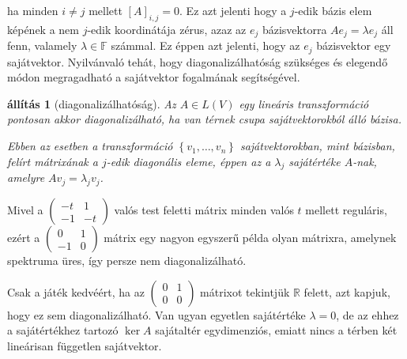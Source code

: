 \documentclass[a4paper, showtrims]{memoir}
\theoremstyle{plain}
\newtheorem{proposition}{állítás}[chapter]
\theoremstyle{remark}
\theoremstyle{definition}
\begin{document}
ha minden $i\neq j$ mellett $\left[ A \right]_{i,j}=0.$
Ez azt jelenti hogy a $j$-edik bázis elem képének a nem $j$-edik koordinátája zérus,
azaz az $e_j$ bázisvektorra $Ae_j=\lambda e_j$ áll fenn,
valamely $\lambda\in\mathbb{F}$ számmal.
Ez éppen azt jelenti,
hogy az $e_j$ bázisvektor egy sajátvektor.
Nyilvánvaló tehát,
hogy diagonalizálhatóság szükséges és elegendő módon megragadható a sajátvektor fogalmának segítségével.
\begin{proposition}[diagonalizálhatóság]
	Az $A\in L\left( V \right)$ egy lineáris transzformáció
	pontosan akkor diagonalizálható,
	ha van térnek csupa sajátvektorokból álló bázisa.

	Ebben az esetben a transzformáció $\left\{ v_1,\ldots,v_n \right\}$ sajátvektorokban, mint bázisban,
    felírt mátrixának a $j$-edik diagonális eleme,
    éppen az a $\lambda_j$ sajátértéke $A$-nak,
    amelyre $Av_j=\lambda_jv_j$.
\end{proposition}
Mivel a
\begin{math}
	\begin{pmatrix}
		-t & 1 \\-1&-t
	\end{pmatrix}
\end{math}
valós test feletti mátrix minden valós $t$ mellett reguláris,
ezért a
\begin{math}
	\begin{pmatrix}
		0 & 1 \\-1&0
	\end{pmatrix}
\end{math}
mátrix egy nagyon egyszerű példa olyan mátrixra, amelynek spektruma üres,
így persze nem diagonalizálható.

Csak a játék kedvéért, ha az
\begin{math}
	\begin{pmatrix}
		0 & 1 \\0&0
	\end{pmatrix}
\end{math}
mátrixot tekintjük $\mathbb{R}$ felett,
azt kapjuk, hogy ez sem diagonalizálható.
Van ugyan egyetlen sajátértéke $\lambda=0$,
de az ehhez a sajátértékhez tartozó $\ker A$ sajátaltér egydimenziós,
emiatt nincs a térben két lineárisan független sajátvektor.
\end{document}
